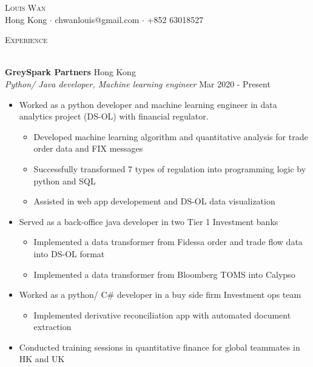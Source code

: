 \documentclass[a4paper]{article}
\newcommand{\lineunder} {
    \vspace*{-8pt} \\
    \hspace*{-18pt} \hrulefill \\
}
\newcommand{\header} [1] {
    {\hspace*{-18pt}\vspace*{6pt} \textsc{#1}}
    \vspace*{-6pt} \lineunder
}
\begin{document}
\vspace*{-40pt}

    

\vspace*{-10pt}
\begin{center}
	{\Huge \scshape {Louis Wan}}\\
	Hong Kong $\cdot$ chwanlouis@gmail.com $\cdot$ +852 63018527\\
\end{center}

\header{Experience}
\vspace{1mm}

\textbf{GreySpark Partners} \hfill Hong Kong\\
\textit{Python/ Java developer, Machine learning engineer} \hfill Mar 2020 - Present\\
\vspace{-1mm}
\begin{itemize} \itemsep 1pt
	\item Worked as a python developer and machine learning engineer in data analytics project (DS-OL) with financial regulator.
        \begin{itemize}
            \item Developed machine learning algorithm and quantitative analysis for trade order data and FIX messages
            \item Successfully transformed 7 types of regulation into programming logic by python and SQL
            \item Assisted in web app developement and DS-OL data visualization
        \end{itemize}
	\item Served as a back-office java developer in two Tier 1 Investment banks
        \begin{itemize}
            \item Implemented a data transformer from Fidessa order and trade flow data into DS-OL format
            \item Implemented a data transformer from Bloomberg TOMS into Calypso
        \end{itemize}
	\item Worked as a python/ C\# developer in a buy side firm Investment ops team
        \begin{itemize}
            \item Implemented derivative reconciliation app with automated document extraction
        \end{itemize}
	\item Conducted training sessions in quantitative finance for global teammates in HK and UK
\end{itemize}
\end{document}
